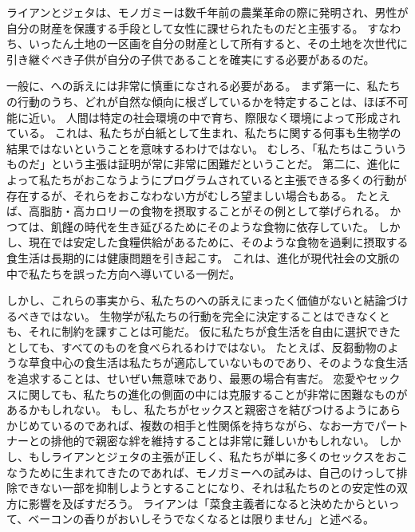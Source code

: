 \documentclass[paper=a4,book,openany]{jlreq}
\begin{document}
ライアンとジェタは、モノガミーは数千年前の農業革命の際に発明され、男性が自分の財産を保護する手段として女性に課せられたものだと主張する。
すなわち、いったん土地の一区画を自分の財産として所有すると、その土地を次世代に引き継ぐべき子供が自分の子供であることを確実にする必要があるのだ。

一般に、への訴えには非常に慎重になされる必要がある。
まず第一に、私たちの行動のうち、どれが自然な傾向に根ざしているかを特定することは、ほぼ不可能に近い。
人間は特定の社会環境の中で育ち、際限なく環境によって形成されている。
これは、私たちが白紙として生まれ、私たちに関する何事も生物学の結果ではないということを意味するわけではない。
むしろ、「私たちはこういうものだ」という主張は証明が常に非常に困難だということだ。
第二に、進化によって私たちがおこなうようにプログラムされていると主張できる多くの行動が存在するが、それらをおこなわない方がむしろ望ましい場合もある。
たとえば、高脂肪・高カロリーの食物を摂取することがその例として挙げられる。
かつては、飢饉の時代を生き延びるためにそのような食物に依存していた。
しかし、現在では安定した食糧供給があるために、そのような食物を過剰に摂取する食生活は長期的には健康問題を引き起こす。
これは、進化が現代社会の文脈の中で私たちを誤った方向へ導いている一例だ。

しかし、これらの事実から、私たちのへの訴えにまったく価値がないと結論づけるべきではない。
生物学が私たちの行動を完全に決定することはできなくとも、それに制約を課すことは可能だ。
仮に私たちが食生活を自由に選択できたとしても、すべてのものを食べられるわけではない。
たとえば、反芻動物のような草食中心の食生活は私たちが適応していないものであり、そのような食生活を追求することは、せいぜい無意味であり、最悪の場合有害だ。
恋愛やセックスに関しても、私たちの進化の側面の中には克服することが非常に困難なものがあるかもしれない。
もし、私たちがセックスと親密さを結びつけるようにあらかじめているのであれば、複数の相手と性関係を持ちながら、なお一方でパートナーとの排他的で親密な絆を維持することは非常に難しいかもしれない。
しかし、もしライアンとジェタの主張が正しく、私たちが単に多くのセックスをおこなうために生まれてきたのであれば、モノガミーへの試みは、自己のけっして排除できない一部を抑制しようとすることになり、それは私たちのとの安定性の双方に影響を及ぼすだろう。
ライアンは「菜食主義者になると決めたからといって、ベーコンの香りがおいしそうでなくなるとは限りません」と述べる\citep{bishop10:_ask_chris_ryan_ph}。
\end{document}
